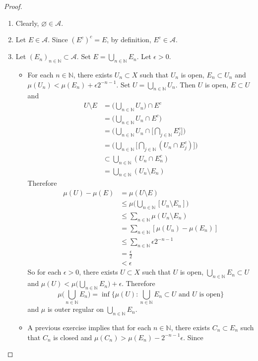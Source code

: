 \documentclass{book}
\theoremstyle{definition}
\newcommand{\ep}{\epsilon}
\newcommand{\N}{\mathbb{N}}
\newcommand{\MA}{\mathcal{A}}
\DeclareMathOperator*{\0}{\mbf{0}}
\DeclareMathOperator*{\1}{\mbf{1}}
\begin{document}
	\begin{proof}\ 
		\begin{enumerate}
			\item Clearly, $\varnothing \in \MA$.
			\item Let $E \in \MA$. Since $(E^c)^c = E$, by definition, $E^c \in \MA$. 
			\item Let $(E_n)_{n \in \N} \subset \MA$. Set $E = \bigcup\limits_{n \in \N} E_n$. Let $\ep >0$. 
			\begin{itemize}
				\item For each $n \in \N$, there exists $U_n \subset X$ such that $U_n$ is open, $E_n \subset U_n$ and $\mu(U_n) < \mu(E_n) + \ep 2^{-n - 1 }$. Set $U = \bigcup\limits_{n\in\N} U_n$. Then $U$ is open, $E \subset U$ and 
				\begin{align*} 
					U \setminus E
					&= \bigg( \bigcup_{n \in \N} U_n \bigg) \cap  E^c \\
					&= \bigg( \bigcup_{n \in \N} U_n \cap E^c \bigg)  \\
					&= \bigg( \bigcup_{n \in \N} U_n \cap \bigg[ \bigcap_{j \in \N} E_j^c \bigg] \bigg) \\
					&= \bigg( \bigcup_{n \in \N} \bigg [ \bigcap_{j \in \N} (U_n \cap E_j^c)\bigg ]  \bigg) \\
					& \subset \bigcup_{n \in \N} (U_n \cap E_n^c)  \\
					&= \bigcup_{n \in \N} (U_n \setminus E_n) 
				\end{align*}
				Therefore
				\begin{align*}
					\mu(U) - \mu(E)
					&= \mu(U \setminus E) \\
					& \leq \mu \bigg(\bigcup_{n \in \N} [U_n \setminus E_n] \bigg) \\
					& \leq \sum_{n \in \N} \mu(U_n \setminus E_n) \\
					&= \sum_{n \in \N} [\mu(U_n) - \mu(E_n)] \\
					& \leq \sum_{n \in \N} \ep 2^{-n-1} \\
					&= \frac{\ep}{2} \\
					& < \ep
				\end{align*}
				So for each $\ep >0$, there exists $U \subset X$ such that $U$ is open, $\bigcup_{n \in \N}E_n \subset U$ and $\mu(U) < \mu \bigg( \bigcup_{n \in \N} E_n \bigg) + \ep$. Therefore $$\mu \bigg( \bigcup_{n \in \N} E_n \bigg) = \inf \bigg \{ \mu(U): \bigcup_{n \in \N} E_n \subset U \text{ and $U$ is open} \bigg \}$$
				and $\mu$ is outer regular on $\bigcup\limits_{n \in \N} E_n$.
				\item A previous exercise implies that for each $n \in \N$, there exists $C_n \subset E_n$ such that $C_n$ is closed and $\mu(C_n) > \mu(E_n) - 2^{-n-1}\ep$. Since 

\end{itemize}
\end{enumerate}
\end{proof}
\end{document}
